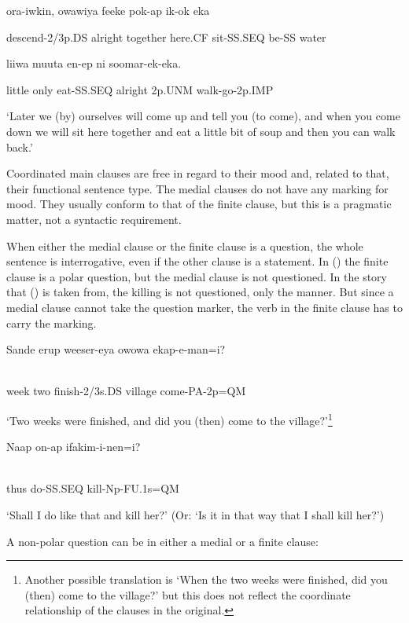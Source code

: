 ora-iwkin,    owawiya  feeke  pok-ap  ik-ok  eka

descend-2/3p.DS  alright  together  here.CF  sit-SS.SEQ  be-SS  water

liiwa  muuta  en-ep    ni  soomar-ek-eka.

little  only  eat-SS.SEQ  alright  2p.UNM  walk-go-2p.IMP

`Later we (by) ourselves will come up and tell you (to come), and when you come down we will sit here together and eat a little bit of soup and then you can walk back.'

Coordinated main clauses are free in regard to their mood and, related to that, their functional sentence type. The medial clauses do not have any marking for mood.  They usually conform to that of the finite clause, but this is a pragmatic matter, not a syntactic requirement. 

When either the medial clause or the finite clause is a question, the whole sentence is interrogative, even if the other clause is a statement. In () the finite clause is a polar question, but the medial clause is not questioned. In the story that () is taken from, the killing is not questioned, only the manner. But since a medial clause cannot take the question marker, the verb in the finite clause has to carry the marking.

\ea%
\label{ex:x1449}
\gll Sande  erup  weeser-eya  owowa  ekap-e-man=i? \\
      \\
\glt
\z

week  two  finish-2/3s.DS  village  come-PA-2p=QM

`Two weeks were finished, and did you (then) come to the village?'\footnote{Another possible translation is `When the two weeks were finished, did you (then) come to the village?' but this does not reflect the coordinate relationship of the clauses in the original.}

\ea%
\label{ex:x1452}
\gll Naap  on-ap  ifakim-i-nen=i? \\
      \\
\glt
\z

thus  do-SS.SEQ  kill-Np-FU.1s=QM

`Shall I do like that and kill her?' (Or: `Is it in that way that I shall kill her?')

A non-polar question can be in either a medial or a finite clause:


